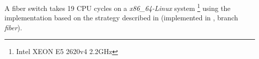
A fiber switch takes 19 CPU cycles on a \emph{x86\_64-Linux} system
\footnote{Intel XEON E5 2620v4 2.2GHz} using the implementation based on
the strategy described in  (implemented in
\bcontext\cite{bcontext}, branch \emph{fiber}).
